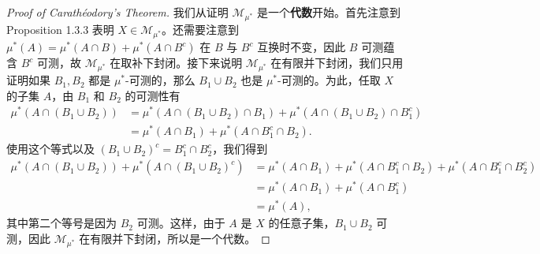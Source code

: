 \documentclass[11pt]{article}
\newcommand{\calM}{\mathcal{M}}
\begin{document}
\begin{proof}[Proof of Carath\'eodory's Theorem]
    我们从证明 $\calM_{\mu^*}$ 是一个{\normalfont\bfseries 代数}开始。首先注意到 Proposition 1.3.3 表明 $X \in \calM_{\mu^*}$。还需要注意到 $\mu^*(A) = \mu^*(A\cap B)+\mu^*(A\cap B^c)$ 在 $B$ 与 $B^c$ 互换时不变，因此 $B$ 可测蕴含 $B^c$ 可测，故 $\calM_{\mu^*}$ 在取补下封闭。接下来说明 $\calM_{\mu^*}$ 在有限并下封闭，我们只用证明如果 $B_1,B_2$ 都是 $\mu^*$-可测的，那么 $B_1\cup B_2$ 也是 $\mu^*$-可测的。为此，任取 $X$ 的子集 $A$，由 $B_1$ 和 $B_2$ 的可测性有
    \begin{align*}
        \mu^*(A\cap(B_1\cup B_2))
         & = \mu^*(A\cap(B_1\cup B_2)\cap B_1) + \mu^*(A\cap(B_1\cup B_2)\cap B_1^c) \\
         & = \mu^*(A\cap B_1) + \mu^*(A\cap B_1^c \cap B_2).
    \end{align*}
    使用这个等式以及 $(B_1\cup B_2)^c = B_1^c \cap B_2^c$，我们得到
    \begin{align*}
        \mu^*(A\cap(B_1\cup B_2)) + \mu^*(A\cap(B_1\cup B_2)^c)
         & = \mu^*(A\cap B_1) + \mu^*(A\cap B_1^c \cap B_2) + \mu^*(A\cap B_1^c \cap B_2^c) \\
         & = \mu^*(A\cap B_1) + \mu^*(A\cap B_1^c)                                          \\
         & = \mu^*(A),
    \end{align*}
    其中第二个等号是因为 $B_2$ 可测。这样，由于 $A$ 是 $X$ 的任意子集，$B_1\cup B_2$ 可测，因此 $\calM_{\mu^*}$ 在有限并下封闭，所以是一个代数。


\end{proof}
\end{document}
